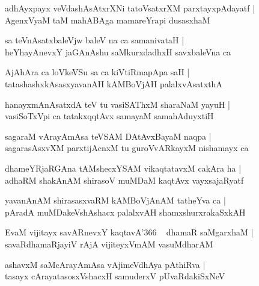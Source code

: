 \documentclass[twoside,12pt,openright]{book}
\newcounter{shloka}[chapter]
\begin{document}
\begin{shloka}%
adhAyxpayx veVdashAsAtxrXNi tatoVsatxrXM parxtayxpAdayatf |\\
AgenxVyaM taM mahABAga mamareYrapi dusasxhaM 
\end{shloka}

\begin{shloka}%
sa teVnAsatxbaleVjw baleV na ca samanivataH |\\
heYhayAnevxY jaGAnAshu saMkurxdadhxH savxbaleVna ca 
\end{shloka}

\begin{shloka}%
AjAhAra ca loVkeVSu sa ca kiVtiRmapApa saH |\\
tatashashxkAsasxyavanAH kAMBoVjAH palalxvAsatxthA 
\end{shloka}

\begin{shloka}%
hanayxmAnAsatxdA teV tu vasiSAThxM sharaNaM yayuH |\\
vasiSoTxVpi ca tatakxqqtAvx samayaM samahAduyxtiH
\end{shloka}

\begin{shloka}%
sagaraM vArayAmAsa teVSAM DAtAvxBayaM naqpa |\\
sagarasAsxvXM parxtijAcnxM tu guroVvARkayxM nishamayx ca 
\end{shloka}

\begin{shloka}%
dhameYRjaRGAna tAMshecxYSAM vikaqtatavxM cakAra ha |\\
adhaRM shakAnAM shirasoV muMDaM kaqtAvx vayxsajaRyatf
\end{shloka}

\begin{shloka}%
yavanAnAM shirasasxvaRM kAMBoVjAnAM tatheYva ca |\\
pAradA muMDakeVshAshacx palalxvAH shamxshurxrakaSxkAH 
\end{shloka}

\begin{shloka}%
EvaM vijitayx savARnevxY kaqtavA\char'366 ~ dhamaR saMgarxhaM |\\
savaRdhamaRjayiV rAjA vijiteyxVmAM vasuMdharAM 
\end{shloka}

\begin{shloka}%
ashavxM saMcArayAmAsa vAjimeVdhAya pAthiRva |\\
tasayx cArayatasosxVshacxH samuderxV pUvaRdakiSxNeV 
\end{shloka}
\end{document}
